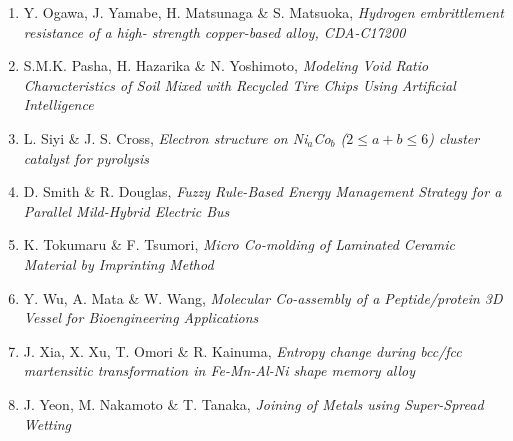 \begin{enumerate}[label=A\arabic*]
\item  Y. Ogawa, J. Yamabe, H. Matsunaga \& S. Matsuoka, {\em Hydrogen embrittlement resistance of a high-
strength copper-based alloy, CDA-C17200}

\item S.M.K. Pasha, H. Hazarika \& N. Yoshimoto, {\em Modeling Void Ratio Characteristics of Soil
Mixed with Recycled Tire Chips Using Artificial
Intelligence}

\item L. Siyi \& J. S. Cross, {\em Electron structure on Ni$_a$Co$_b$ ($2 \le a+b \le 6$) cluster catalyst for pyrolysis}

\item D. Smith \& R. Douglas, {\em Fuzzy Rule-Based Energy Management Strategy
for a Parallel Mild-Hybrid Electric Bus}

\item K. Tokumaru \& F. Tsumori, {\em Micro Co-molding of Laminated Ceramic
Material by Imprinting Method}

\item Y. Wu, A. Mata \& W. Wang, {\em Molecular Co-assembly of a Peptide/protein 3D
Vessel for Bioengineering Applications}

\item   J. Xia, X. Xu, T. Omori \& R. Kainuma, {\em Entropy change during bcc/fcc martensitic
transformation in Fe-Mn-Al-Ni shape memory
alloy}

\item J. Yeon, M. Nakamoto \& T. Tanaka, {\em Joining of Metals using Super-Spread Wetting}


\end{enumerate}
\newpage
{}%
\renewcommand*{\thepage}{A\arabic{page}}
 
 

 

 

 

 

